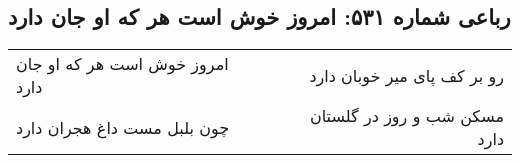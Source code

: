 \begin{center}
\section*{رباعی شماره ۵۳۱: امروز خوش است هر که او جان دارد}
\label{sec:0531}
\begin{longtable}{l p{0.5cm} r}
امروز خوش است هر که او جان دارد
&&
رو بر کف پای میر خوبان دارد
\\
چون بلبل مست داغ هجران دارد
&&
مسکن شب و روز در گلستان دارد
\\
\end{longtable}
\end{center}

